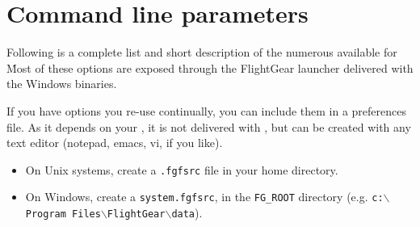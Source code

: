 \section{Command line parameters\label{options}}
Following is a complete list and short description of the numerous 
available for \FlightGear{}\. Most of these options are exposed through the FlightGear launcher delivered with the
Windows binaries.

If you have options you re-use continually, you can include them in a preferences file. As it depends on your
, it is not delivered with \FlightGear{}, but can be created with any text editor (notepad, emacs, vi, if you like). 

\begin{itemize}
\item On Unix systems, create a \texttt{.fgfsrc} file in your home directory.
\item On Windows, create a \texttt{system.fgfsrc}, in
the \texttt{FG\_ROOT} directory (e.g. \texttt{c:$\backslash$Program Files$\backslash$FlightGear$\backslash$data}). 
\end{itemize}

